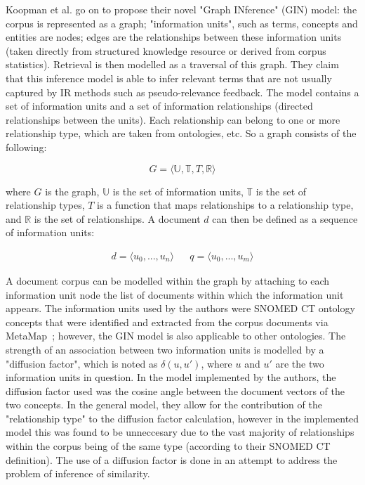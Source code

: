 \documentclass[a4paper]{report}
\begin{document}
Koopman et al. go on to propose their novel "Graph INference" (GIN) model: the corpus is represented as a graph; "information units", such as terms, concepts and entities are nodes; edges are the relationships between these information units (taken directly from structured knowledge resource or derived from corpus statistics). Retrieval is then modelled as a traversal of this graph. They claim that this inference model is able to infer relevant terms that are not usually captured by IR methods such as pseudo-relevance feedback. The model contains a set of information units and a set of information relationships (directed relationships between the units). Each relationship can belong to one or more relationship type, which are taken from ontologies, etc. So a graph consists of the following:

$$G = \langle\mathbb{U,T},T,\mathbb{R}\rangle$$

where $G$ is the graph, $\mathbb{U}$ is the set of information units, $\mathbb{T}$ is the set of relationship types, $T$ is a function that maps relationships to a relationship type, and $\mathbb{R}$ is the set of relationships. A document $d$ can then be defined as a sequence of information units:

\begin{align}
d = \langle u_0,...,u_n \rangle && q = \langle u_0,...,u_m \rangle
\end{align}

A document corpus can be modelled within the graph by attaching to each information unit node the list of documents within which the information unit appears. The information units used by the authors were SNOMED CT ontology concepts that were identified and extracted from the corpus documents via MetaMap~\cite{aronson2001effective}; however, the GIN model is also applicable to other ontologies. The strength of an association between two information units is modelled by a "diffusion factor", which is noted as $\delta(u,u')$, where $u$ and $u'$ are the two information units in question. In the model implemented by the authors, the diffusion factor used was the cosine angle between the document vectors of the two concepts. In the general model, they allow for the contribution of the "relationship type" to the diffusion factor calculation, however in the implemented model this was found to be unneccesary due to the vast majority of relationships within the corpus being of the same type (according to their SNOMED CT definition). The use of a diffusion factor is done in an attempt to address the problem of inference of similarity.
\end{document}
